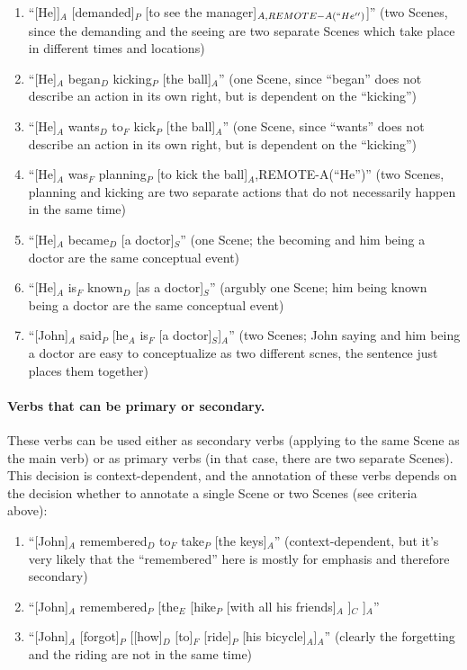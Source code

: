 \documentclass[11pt]{article}
\newcommand{\be}{\begin{enumerate}}
\newcommand{\ee}{\end{enumerate}}
\begin{document}
\be
\item
``[He]]$_A$ [demanded]$_P$ [to see the manager]$_{A,REMOTE-A(``He'')}$]'' (two Scenes, since the demanding and the seeing are two separate Scenes which take place in different times and locations)
\item
``[He]$_A$ began$_D$ kicking$_P$ [the ball]$_A$'' (one Scene, since ``began'' does not describe an action in its own right, but is dependent on the ``kicking'')
\item
``[He]$_A$ wants$_D$ to$_F$ kick$_P$ [the ball]$_A$'' (one Scene, since ``wants'' does not describe an action in its own right, but is dependent on the ``kicking'')
\item
  ``[He]$_A$ was$_F$ planning$_P$ [to kick the ball]$_A$,REMOTE-A(``He'')'' (two Scenes,  planning and kicking are two separate actions that do not necessarily happen in the same time)
\item
  ``[He]$_A$ became$_D$ [a doctor]$_S$'' (one Scene; the becoming and him being a doctor are the same conceptual event)
\item
  ``[He]$_A$ is$_F$ known$_D$ [as a doctor]$_S$'' (argubly one Scene; him being known being a doctor are the same conceptual event)
\item
  ``[John]$_A$ said$_P$ [he$_A$ is$_F$ [a doctor]$_S$]$_A$'' (two Scenes; John saying and him being a doctor are easy to conceptualize as two different scnes, the sentence just places them together)
 
\ee

\paragraph{Verbs that can be primary or secondary.} These verbs can be used either as secondary verbs (applying to the same Scene as the main verb) or as primary verbs (in that case, there are two separate Scenes). This decision is context-dependent, and the annotation of these verbs depends on the decision whether to annotate a single Scene or two Scenes (see criteria above):
\be
\item
``[John]$_A$ remembered$_D$ to$_F$ take$_P$ [the keys]$_A$'' (context-dependent, but it's very likely that the ``remembered'' here is mostly for emphasis and therefore secondary)
\item
``[John]$_A$ remembered$_P$ [the$_E$ [hike$_P$ [with all his friends]$_A$ ]$_C$ ]$_A$''
\item
``[John]$_A$ [forgot]$_P$ [[how]$_D$ [to]$_F$ [ride]$_P$ [his bicycle]$_A$]$_A$'' (clearly the forgetting and the riding are not in the same time)
\ee
\end{document}
